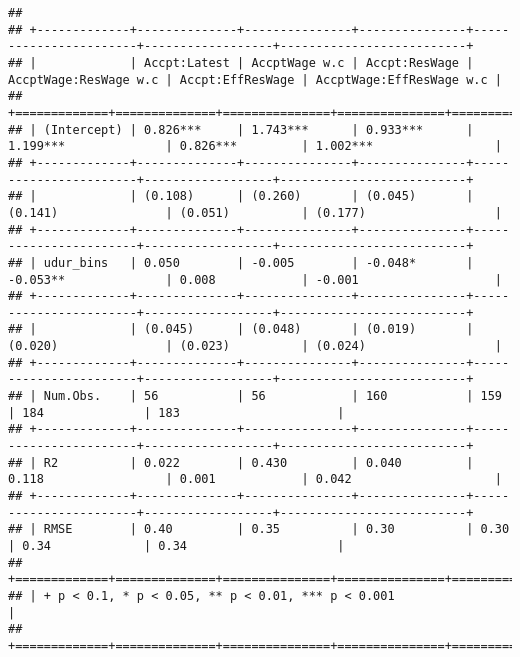\begin{verbatim}
## 
## +-------------+--------------+---------------+---------------+-----------------------+------------------+--------------------------+
## |             | Accpt:Latest | AccptWage w.c | Accpt:ResWage | AccptWage:ResWage w.c | Accpt:EffResWage | AccptWage:EffResWage w.c |
## +=============+==============+===============+===============+=======================+==================+==========================+
## | (Intercept) | 0.826***     | 1.743***      | 0.933***      | 1.199***              | 0.826***         | 1.002***                 |
## +-------------+--------------+---------------+---------------+-----------------------+------------------+--------------------------+
## |             | (0.108)      | (0.260)       | (0.045)       | (0.141)               | (0.051)          | (0.177)                  |
## +-------------+--------------+---------------+---------------+-----------------------+------------------+--------------------------+
## | udur_bins   | 0.050        | -0.005        | -0.048*       | -0.053**              | 0.008            | -0.001                   |
## +-------------+--------------+---------------+---------------+-----------------------+------------------+--------------------------+
## |             | (0.045)      | (0.048)       | (0.019)       | (0.020)               | (0.023)          | (0.024)                  |
## +-------------+--------------+---------------+---------------+-----------------------+------------------+--------------------------+
## | Num.Obs.    | 56           | 56            | 160           | 159                   | 184              | 183                      |
## +-------------+--------------+---------------+---------------+-----------------------+------------------+--------------------------+
## | R2          | 0.022        | 0.430         | 0.040         | 0.118                 | 0.001            | 0.042                    |
## +-------------+--------------+---------------+---------------+-----------------------+------------------+--------------------------+
## | RMSE        | 0.40         | 0.35          | 0.30          | 0.30                  | 0.34             | 0.34                     |
## +=============+==============+===============+===============+=======================+==================+==========================+
## | + p < 0.1, * p < 0.05, ** p < 0.01, *** p < 0.001                                                                                |
## +=============+==============+===============+===============+=======================+==================+==========================+

\end{verbatim}
